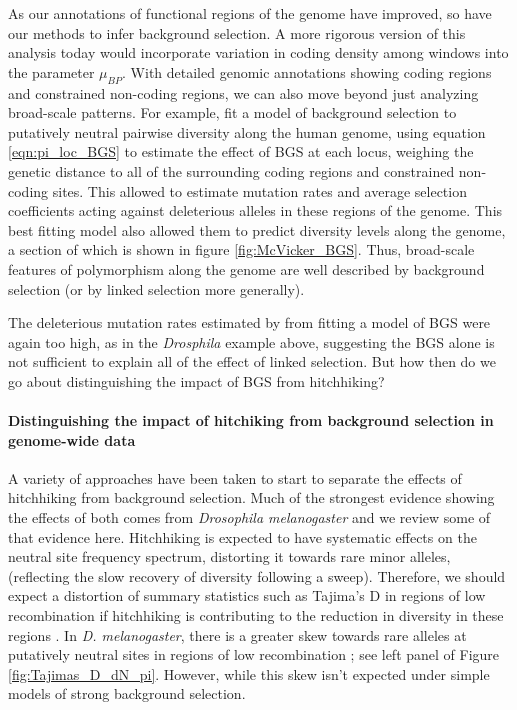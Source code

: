 As our annotations of functional regions of the genome have improved, so have our
methods to infer background selection. A more rigorous version of this analysis today would incorporate variation in coding density among windows into the parameter $\mu_{BP}$. With detailed genomic annotations showing
coding regions and constrained non-coding regions, we can also move
beyond just analyzing broad-scale patterns. For example,
\citet{Mcvicker:09} fit a model of background selection to putatively
neutral pairwise diversity along the human genome, using equation
\ref{eqn:pi_loc_BGS} to estimate the effect of BGS at each locus,
weighing the genetic distance to all of the surrounding coding
regions and constrained non-coding sites. This allowed
\citet{Mcvicker:09} to estimate mutation rates and average selection
coefficients acting against deleterious alleles in these regions of
the genome. This best fitting model also allowed them to predict
diversity levels along the genome, a section of which is shown in
figure \ref{fig:McVicker_BGS}. Thus, broad-scale features of
polymorphism along the genome are well described by background selection
(or by linked selection more generally).

The deleterious mutation rates estimated by \citet{Mcvicker:09} from
fitting a model of BGS were again too high, as in the {\it Drosphila}
example above, suggesting the BGS alone is not sufficient to
explain all of the effect of linked selection. But how then do we go about distinguishing the impact of BGS from hitchhiking? 

\paragraph{Distinguishing the impact of hitchiking from  background selection in
  genome-wide data}

A variety of approaches have been taken to start to separate the effects of hitchhiking from background
selection. Much of the
strongest evidence showing the effects of both comes from
\textit{Drosophila melanogaster} and we review some of that evidence here. 
Hitchhiking is expected to have systematic effects on the neutral site
frequency spectrum, distorting it towards rare minor alleles,
(reflecting the slow recovery of diversity following a
sweep). Therefore, we should expect a distortion of summary
statistics such as Tajima's D in regions of low recombination if
hitchhiking is contributing to the reduction in diversity in these
regions \citep{Braverman:95, Przeworski:02,Kim:06}. In \textit{D. melanogaster}, there is a greater skew towards rare
alleles at putatively neutral sites in regions of low recombination
\citep{Andolfatto:01,Shapiro:07}; see left panel of Figure
\ref{fig:Tajimas_D_dN_pi}. However, while this skew isn't expected under
simple models of strong background selection.

